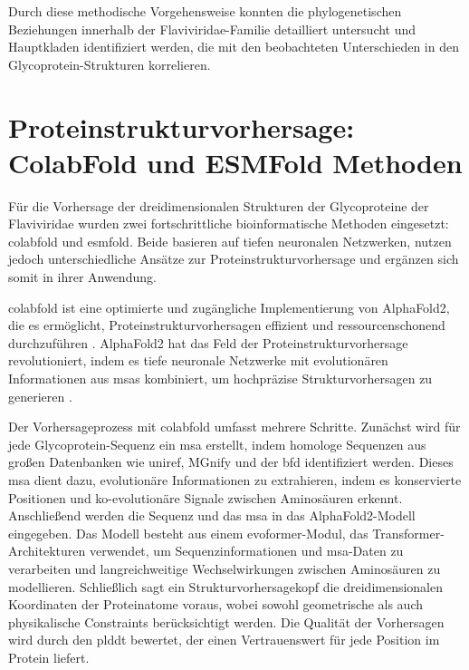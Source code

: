 Durch diese methodische Vorgehensweise konnten die phylogenetischen Beziehungen innerhalb der Flaviviridae-Familie detailliert untersucht und Hauptkladen identifiziert werden, die mit den beobachteten Unterschieden in den Glycoprotein-Strukturen korrelieren.

\section{Proteinstrukturvorhersage: ColabFold und ESMFold Methoden} \label{sec:colabfold-esmfold}

Für die Vorhersage der dreidimensionalen Strukturen der Glycoproteine der Flaviviridae wurden zwei fortschrittliche bioinformatische Methoden eingesetzt: \gls{colabfold} und \gls{esmfold}. Beide basieren auf tiefen neuronalen Netzwerken, nutzen jedoch unterschiedliche Ansätze zur Proteinstrukturvorhersage und ergänzen sich somit in ihrer Anwendung.

\gls{colabfold} ist eine optimierte und zugängliche Implementierung von AlphaFold2, die es ermöglicht, Proteinstrukturvorhersagen effizient und ressourcenschonend durchzuführen \autocite{Mirdita2022}. AlphaFold2 hat das Feld der Proteinstrukturvorhersage revolutioniert, indem es tiefe neuronale Netzwerke mit evolutionären Informationen aus \glspl{msa} kombiniert, um hochpräzise Strukturvorhersagen zu generieren \autocite{Jumper2021}.

Der Vorhersageprozess mit \gls{colabfold} umfasst mehrere Schritte. Zunächst wird für jede Glycoprotein-Sequenz ein \gls{msa} erstellt, indem homologe Sequenzen aus großen Datenbanken wie \gls{uniref}, MGnify und der \gls{bfd} identifiziert werden. Dieses \gls{msa} dient dazu, evolutionäre Informationen zu extrahieren, indem es konservierte Positionen und ko-evolutionäre Signale zwischen Aminosäuren erkennt. Anschließend werden die Sequenz und das \gls{msa} in das AlphaFold2-Modell eingegeben. Das Modell besteht aus einem \gls{evoformer}-Modul, das Transformer-Architekturen verwendet, um Sequenzinformationen und \gls{msa}-Daten zu verarbeiten und langreichweitige Wechselwirkungen zwischen Aminosäuren zu modellieren. Schließlich sagt ein Strukturvorhersagekopf die dreidimensionalen Koordinaten der Proteinatome voraus, wobei sowohl geometrische als auch physikalische Constraints berücksichtigt werden. Die Qualität der Vorhersagen wird durch den \gls{plddt} bewertet, der einen Vertrauenswert für jede Position im Protein liefert.

